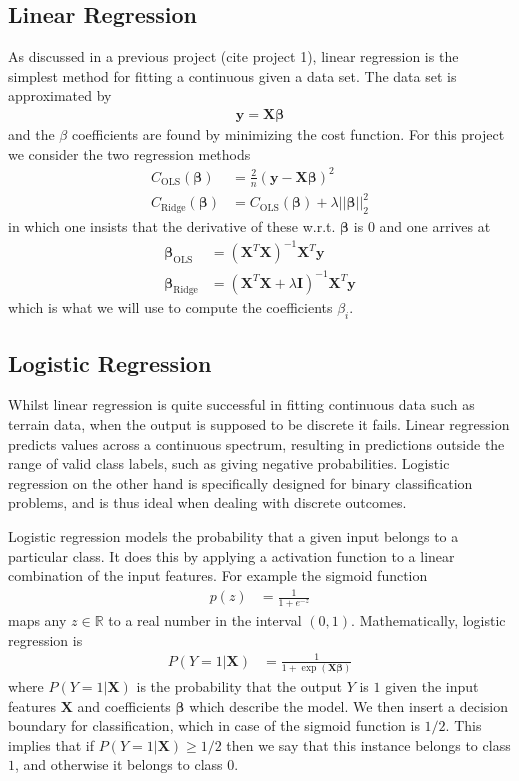 \documentclass[%
reprint,
amsmath,amssymb,
aps,
]{revtex4-2}
\begin{document}
\subsection{Linear Regression}
As discussed in a previous project (cite project 1), linear regression is the simplest method for fitting a continuous given a data set. The data set is approximated by
\begin{align}
	\bm y=\bm X\bm\beta
\end{align}
and the $\beta$ coefficients are found by minimizing the cost function. For this project we consider the two regression methods
\begin{align}
	C_\text{OLS}(\bm\beta)&=\frac{2}{n}(\bm y-\bm X\bm\beta)^2\\
	C_\text{Ridge}(\bm\beta)&=C_\text{OLS}(\bm\beta)+\lambda||\bm\beta||_2^2
\end{align}
in which one insists that the derivative of these w.r.t. $\bm\beta$ is $0$ and one arrives at
\begin{align}
	\bm\beta_\text{OLS}&=(\bm X^T\bm X)^{-1}\bm X^T\bm y\\
	\bm\beta_\text{Ridge}&=(\bm X^T\bm X+\lambda \bm I)^{-1}\bm X^T\bm y
\end{align}
which is what we will use to compute the coefficients $\beta_i$.

\subsection{Logistic Regression}
Whilst linear regression is quite successful in fitting continuous data such as terrain data, when the output is supposed to be discrete it fails. Linear regression predicts values across a continuous spectrum, resulting in predictions outside the range of valid class labels, such as giving negative probabilities. Logistic regression on the other hand is specifically designed for binary classification problems, and is thus ideal when dealing with discrete outcomes. 

Logistic regression models the probability that a given input belongs to a particular class. It does this by applying a activation function to a linear combination of the input features. For example the sigmoid function 
\begin{align}
	p(z)&=\frac{1}{1+e^{-z}}
\end{align}
maps any $z\in\mathbb{R}$ to a real number in the interval $(0,1)$. Mathematically, logistic regression is
\begin{align}
	P(Y=1|\bm X)&=\frac{1}{1+\exp(\bm X\bm\beta)}
\end{align}
where $P(Y=1|\bm X)$ is the probability that the output $Y$ is $1$ given the input features $\bm X$ and coefficients $\bm \beta$ which describe the model. We then insert a decision boundary for classification, which in case of the sigmoid function is $1/2$. This implies that if $P(Y=1|\bm X)\geq 1/2$ then we say that this instance belongs to class $1$, and otherwise it belongs to class $0$.
\end{document}
